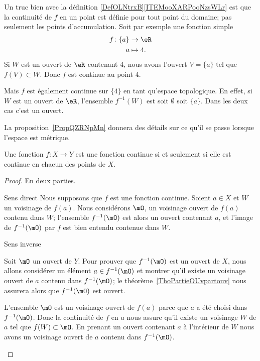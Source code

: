 \begin{example}
    Un truc bien avec la définition \ref{DefOLNtrxB}\ref{ITEMooXARPooNzsWLr} est que la continuité de \( f\) en un point est définie pour tout point du domaine; pas seulement les points d'accumulation. Soit par exemple une fonction simple
    \begin{equation}
        \begin{aligned}
            f\colon \{a\}&\to \eR \\
            a&\mapsto 4. 
        \end{aligned}
    \end{equation}
    Si \( W\) est un ouvert de \( \eR\) contenant \( 4\), nous avons l'ouvert \( V=\{a\}\) tel que \( f(V)\subset W\). Donc \( f\) est continue au point \( 4\).

    Mais \( f\) est également continue sur \( \{4\}\) en tant qu'espace topologique. En effet, si \( W\) est un ouvert de \( \eR\), l'ensemble \( f^{-1}(W)\) est soit \( \emptyset\) soit \( \{a\}\). Dans les deux cas c'est un ouvert.
\end{example}

La proposition~\ref{PropQZRNpMn} donnera des détails sur ce qu'il se passe lorsque l'espace est métrique.

\begin{theorem} \label{ThoESCaraB}
    Une fonction \( f\colon X\to Y\) est une fonction continue si et seulement si elle est continue en chacun des points de \( X\).
\end{theorem}

\begin{proof}
    En deux parties.
    \begin{subproof}
    \item[Sens direct]
        Nous supposons que \( f\) est une fonction continue. Soient \( a\in X\) et \( W\) un voisinage de \( f(a)\). Nous considérons \( \mO\), un voisinage ouvert de \( f(a)\) contenu dans \( W\); l'ensemble \( f^{-1}(\mO)\) est alors un ouvert contenant \( a\), et l'image de \( f^{-1}(\mO)\) par \( f\) est bien entendu contenue dans \( W\).

    \item[Sens inverse]

        Soit \( \mO\) un ouvert de \( Y\). Pour prouver que \( f^{-1}(\mO)\) est un ouvert de \( X\), nous allons considérer un élément \( a\in f^{-1}(\mO)\) et montrer qu'il existe un voisinage ouvert de \( a\) contenu dans \( f^{-1}(\mO)\); le théorème~\ref{ThoPartieOUvpartouv} nous assurera alors que \( f^{-1}(\mO)\) est ouvert.

        L'ensemble \( \mO\) est un voisinage ouvert de \( f(a)\) parce que \( a\) a été choisi dans \( f^{-1}(\mO)\). Donc la continuité de \( f\) en \( a\) nous assure qu'il existe un voisinage \( W\) de \( a\) tel que \( f(W)\subset\mO\). En prenant un ouvert contenant \( a\) à l'intérieur de \( W\) nous avons un voisinage ouvert de \( a\) contenu dans \( f^{-1}(\mO)\).
    \end{subproof}
\end{proof}

